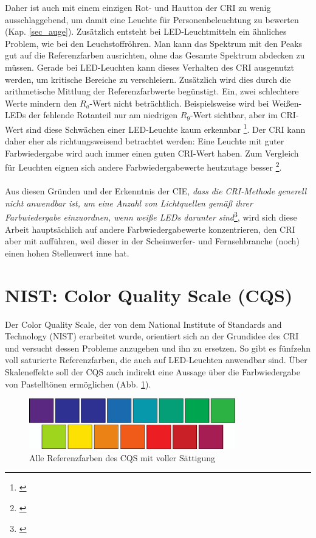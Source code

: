  

 Daher ist auch mit einem einzigen Rot- und Hautton der CRI zu wenig ausschlaggebend, um damit eine Leuchte für Personenbeleuchtung zu bewerten (Kap. \ref{sec_auge}). Zusätzlich entsteht bei LED-Leuchtmitteln ein ähnliches Problem, wie bei den Leuchstoffröhren. Man kann das Spektrum mit den Peaks gut auf die Referenzfarben ausrichten, ohne das Gesamte Spektrum abdecken zu müssen. Gerade bei LED-Leuchten kann dieses Verhalten des CRI ausgenutzt werden, um kritische Bereiche zu verschleiern. Zusätzlich wird dies durch die arithmetische Mittlung der Referenzfarbwerte begünstigt. Ein, zwei schlechtere Werte mindern den $R_{a}$-Wert nicht beträchtlich. Beispielsweise wird bei Weißen-LEDs der fehlende Rotanteil nur am niedrigen $R_{9}$-Wert sichtbar, aber im CRI-Wert sind diese Schwächen einer LED-Leuchte kaum erkennbar \footnote{\cite{davis_ohno}}. Der CRI kann daher eher als richtungsweisend betrachtet werden: Eine Leuchte mit guter Farbwiedergabe wird auch immer einen guten CRI-Wert haben. Zum Vergleich für Leuchten eignen sich andere Farbwiedergabewerte heutzutage besser \footnote{\cite{production partner}}.\\\\
Aus diesen Gründen und der Erkenntnis der CIE, \emph{\glqq dass die CRI-Methode generell nicht anwendbar ist, um eine Anzahl von Lichtquellen gemäß ihrer Farbwiedergabe einzuordnen, wenn weiße LEDs darunter sind\grqq}\footnote{\citep[VI]{CIE}}, wird sich diese Arbeit hauptsächlich auf andere Farbwiedergabewerte konzentrieren, den CRI aber mit aufführen, weil dieser in der Scheinwerfer- und Fernsehbranche (noch) einen hohen Stellenwert inne hat.

\section{NIST: Color Quality Scale (CQS)} \label{sec_cqs}

Der Color Quality Scale, der von dem National Institute of Standards and Technology (NIST) erarbeitet wurde, orientiert sich an der Grundidee des CRI und versucht dessen Probleme anzugehen und ihn zu ersetzen. So gibt es fünfzehn voll saturierte Referenzfarben, die auch auf LED-Leuchten anwendbar sind. Über Skaleneffekte soll der CQS auch indirekt eine Aussage über die Farbwiedergabe von Pastelltönen ermöglichen (Abb. \ref{b_cqs1}). 

\begin{figure}[htp]     %
\centering
\includegraphics[width=0.8\textwidth]{bilder/cqs} 
\caption {Alle Referenzfarben des CQS mit voller Sättigung\protect\footnotemark}\label{b_cqs1}
\end{figure}

